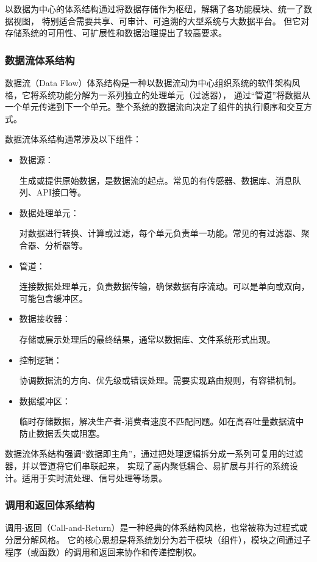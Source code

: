 \documentclass[12pt]{ctexart} %
\begin{document}
以数据为中心的体系结构通过将数据存储作为枢纽，解耦了各功能模块、统一了数据视图，
特别适合需要共享、可审计、可追溯的大型系统与大数据平台。
但它对存储系统的可用性、可扩展性和数据治理提出了较高要求。

\subsubsection{数据流体系结构}
数据流（Data Flow）体系结构是一种以数据流动为中心组织系统的软件架构风格，它将系统功能分解为一系列独立的处理单元（过滤器），
通过“管道”将数据从一个单元传递到下一个单元。整个系统的数据流向决定了组件的执行顺序和交互方式。

数据流体系结构通常涉及以下组件：
\begin{itemize}
  \item 数据源：

  生成或提供原始数据，是数据流的起点。常见的有传感器、数据库、消息队列、API接口等。
  \item 数据处理单元：
  
  对数据进行转换、计算或过滤，每个单元负责单一功能。常见的有过滤器、聚合器、分析器等。
  \item 管道：
  
  连接数据处理单元，负责数据传输，确保数据有序流动。可以是单向或双向，可能包含缓冲区。
  \item 数据接收器：
  
  存储或展示处理后的最终结果，通常以数据库、文件系统形式出现。
  \item 控制逻辑：
  
  协调数据流的方向、优先级或错误处理。需要实现路由规则，有容错机制。
  \item 数据缓冲区：
  
  临时存储数据，解决生产者-消费者速度不匹配问题。如在高吞吐量数据流中防止数据丢失或阻塞。
\end{itemize}

数据流体系结构强调“数据即主角”，通过把处理逻辑拆分成一系列可复用的过滤器，并以管道将它们串联起来，
实现了高内聚低耦合、易扩展与并行的系统设计。适用于实时流处理、信号处理等场景。

\subsubsection{调用和返回体系结构}
调用-返回（Call-and-Return）是一种经典的体系结构风格，也常被称为过程式或分层分解风格。
它的核心思想是将系统划分为若干模块（组件），模块之间通过子程序（或函数）的调用和返回来协作和传递控制权。
\end{document}
